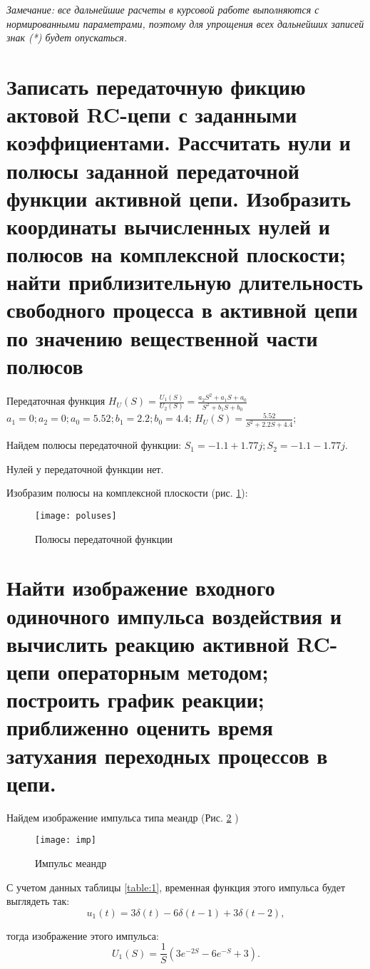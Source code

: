 \documentclass[a4paper,14pt ]{article} %
\begin{document}
    \it{Замечание}\normalfont: все дальнейшие расчеты в курсовой работе выполняются с нормированными параметрами, поэтому для упрощения всех дальнейших записей знак (*) будет опускаться.
    \section{Записать передаточную фикцию актовой RC-цепи с заданными коэффициентами. Рассчитать нули и полюсы заданной передаточной функции активной цепи. Изобразить координаты вычисленных нулей и полюсов на комплексной плоскости; найти приблизительную длительность свободного процесса в активной цепи по значению вещественной части полюсов}
    Передаточная функция $H_U(S) = \frac{U_1(S)}{U_2(S)} = \frac{a_2S^2 + a_1S + a_0}{S^2 + b_1S+b_0}$\\
    $a_1 = 0; a_2 = 0; a_0 = 5.52; b_1 = 2.2; b_0 = 4.4$;
    $H_U(S) = \frac{5.52}{S^2 + 2.2S+ 4.4}$;
    
    Найдем полюсы передаточной функции: 
        $S_1 = -1.1 + 1.77j; S_2 = -1.1 - 1.77j$.

    Нулей у передаточной функции нет.


    Изобразим полюсы на комплексной плоскости (рис. \ref{fig:1}):
    \begin{figure}[H]
        \texttt{[image: poluses]}
        \centering
        \caption{Полюсы передаточной функции}
        \label{fig:1}
    \end{figure} 
    \section{Найти изображение входного одиночного импульса воздействия и вычислить реакцию активной RC-цепи операторным методом; построить график реакции; приближенно оценить время затухания переходных процессов в цепи.}
    Найдем изображение импульса типа меандр (Рис. \ref{fig:2} )
    \begin{figure}[H]
        \texttt{[image: imp]}
        \centering
        \caption{Импульс меандр}
        \label{fig:2}
    \end{figure}
    С учетом данных таблицы \ref{table:1}, временная функция этого импульса будет выглядеть так:
    \begin{equation}
        u_1(t) = 3\delta (t) - 6\delta(t-1) + 3\delta(t-2),
    \end{equation}


    тогда изображение этого импульса:
    \begin{equation}
        U_1(S) = \frac{1}{S}\left(3e^{-2S} - 6e^{-S} + 3\right). 
    \end{equation}
\end{document}
